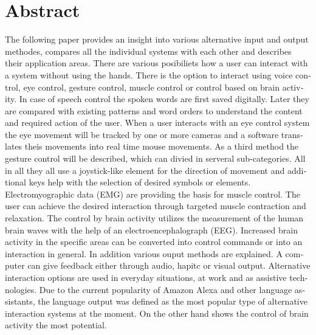 \chapter{Abstract}

\begin{english} %
The following paper provides an insight into various alternative input and output methodes, compares all the individual systems with each other and describes their application areas.
\newline \newline
There are various posibiliets how a user can interact with a system without using the hands. There is the option to interact using voice control, eye control, gesture control, muscle control or control based on brain activity. In case of speech control the spoken words are first saved digitally. Later they are compared with existing patterns and word orders to understand the content and required action of the user. When a user interacts with an eye control system the eye movement will be tracked by one or more cameras and a software translates theis movements into real time mouse movements. As a third method the gesture control will be described, which can divied in serveral sub-categories. All in all they all use a joystick-like element for the direction of movement and additional keys help with the selection of desired symbols or elements. Electromyographic data (EMG) are providing the basis for muscle control. The user can achieve the desired interaction through targeted muscle contraction and relaxation. The control by brain activity utilizes the measurement of the human brain waves with the help of an electroencephalograph (EEG). Increased brain activity in the specific areas can be converted into control commands or into an interaction in general.
\newline \newline
In addition various ouput methods are explained. A computer can give feedback either through audio, hapitc or visual output.
\newline \newline
Alternative interaction options are used in everyday situations, at work and as assistive technologies. Due to the current popularity of Amazon Alexa and other language assistants, the language output was defined as the most popular type of alternative interaction systems at the moment. On the other hand shows the control of brain activity the most potential.
\end{english}



